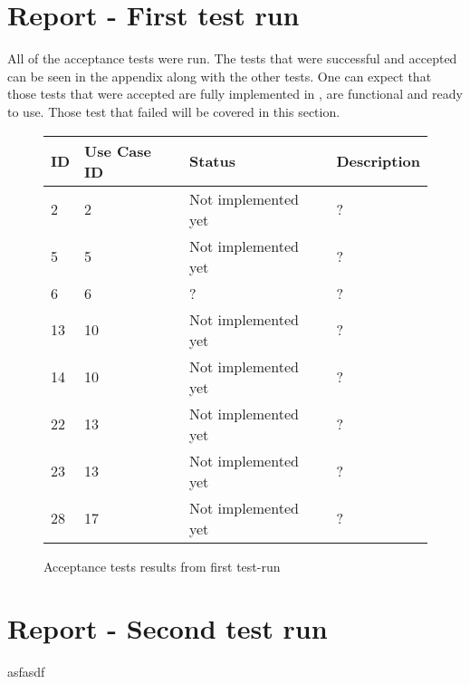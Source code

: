\section{Report - First test run}
\label{sec:testing_report}

All of the acceptance tests were run.
The tests that were successful and accepted can be seen in the appendix along with the other tests.
One can expect that those tests that were accepted are fully implemented in \projectname{}, are functional and ready to use. 
Those test that failed will be covered in this section. 


\begin{figure}[htb]
\begin{center}
\begin{tabular}{ | l | l | l | p{8cm} | }
  \hline
	\textbf{ID} & \textbf{Use Case ID} & \textbf{Status} & \textbf{Description} \\ \hline
	2 & 2 & Not implemented yet & ? \\ \hline
	5 & 5 & Not implemented yet & ? \\ \hline
	6 & 6 & ? & ? \\ \hline
	13 & 10 & Not implemented yet & ? \\ \hline
	14 & 10 & Not implemented yet & ? \\ \hline
	22 & 13 & Not implemented yet & ? \\ \hline
	23 & 13 & Not implemented yet & ? \\ \hline
	28 & 17 & Not implemented yet & ? \\ \hline
  \hline
\end{tabular}
\caption{Acceptance tests results from first test-run}
\label{tab:acceptance_tests_results_first_run}
\end{center}
\end{figure}



\section{Report - Second test run}
asfasdf